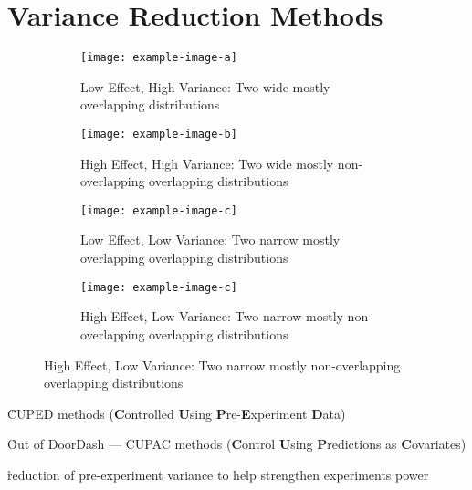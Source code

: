 \section{Variance Reduction Methods}


{}
\begin{figure}
	\begin{subfigure}{6cm}
		\centering\texttt{[image: example-image-a]}
		\caption{Low Effect, High Variance: Two wide mostly overlapping distributions}
	\end{subfigure}
	\begin{subfigure}{6cm}
		\centering\texttt{[image: example-image-b]}
		\caption{High Effect, High Variance: Two wide mostly non-overlapping overlapping distributions}
	\end{subfigure}
	
	\begin{subfigure}{6cm}
		\centering\texttt{[image: example-image-c]}
		\caption{Low Effect, Low Variance: Two narrow mostly overlapping overlapping distributions}
	\end{subfigure}
	\begin{subfigure}{6cm}
		\centering\texttt{[image: example-image-c]}
		\caption{High Effect, Low Variance: Two narrow mostly non-overlapping overlapping distributions}
	\end{subfigure}
\end{figure}

\r{CUPED methods (\textbf{C}ontrolled \textbf{U}sing \textbf{P}re-\textbf{E}xperiment \textbf{D}ata)\cite{deng2013improving}}

\r{Out of DoorDash --- CUPAC methods (\textbf{C}ontrol \textbf{U}sing \textbf{P}redictions as \textbf{C}ovariates)\cite{tangcontrol}}

\r{reduction of pre-experiment variance to help strengthen experiments power}

